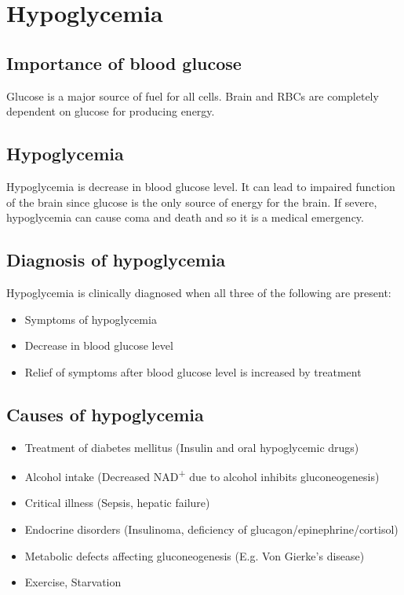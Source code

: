 \documentclass[
]{book}
\begin{document}
\chapter{Hypoglycemia}\label{hypoglycemia}

\section{Importance of blood glucose}\label{importance-of-blood-glucose}

Glucose is a major source of fuel for all cells. Brain and RBCs are completely dependent on glucose for producing energy.

\section{Hypoglycemia}\label{hypoglycemia-1}

Hypoglycemia is decrease in blood glucose level. It can lead to impaired function of the brain since glucose is the only source of energy for the brain. If severe, hypoglycemia can cause coma and death and so it is a medical emergency.

\section{Diagnosis of hypoglycemia}\label{diagnosis-of-hypoglycemia}

Hypoglycemia is clinically diagnosed when all three of the following are present:

\begin{itemize}
\item
  Symptoms of hypoglycemia
\item
  Decrease in blood glucose level
\item
  Relief of symptoms after blood glucose level is increased by treatment
\end{itemize}

\section{Causes of hypoglycemia}\label{causes-of-hypoglycemia}

\begin{itemize}
\item
  Treatment of diabetes mellitus (Insulin and oral hypoglycemic drugs)
\item
  Alcohol intake (Decreased NAD\textsuperscript{+} due to alcohol inhibits gluconeogenesis)
\item
  Critical illness (Sepsis, hepatic failure)
\item
  Endocrine disorders (Insulinoma, deficiency of glucagon/epinephrine/cortisol)
\item
  Metabolic defects affecting gluconeogenesis (E.g. Von Gierke's disease)
\item
  Exercise, Starvation
\end{itemize}
\end{document}

